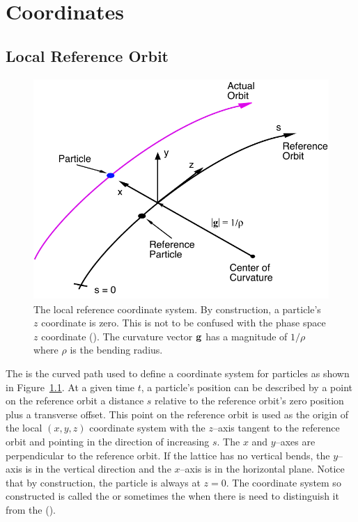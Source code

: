 %


\chapter{Coordinates}

\section{Local Reference Orbit}
\label{s:ref}


\begin{figure}[!b]
  \centering
  \includegraphics[height=8.4cm]{local-coords.pdf}
  \caption[The Local Reference System.]
{The local reference coordinate system. By construction, a
particle's $z$ coordinate is zero.  This is not to be confused with
the phase space $z$ coordinate ().  The curvature
vector ${\bf g}$ has a magnitude of $1/\rho$ where $\rho$ is the bending
radius.}
  \label{f:local.coords}
\end{figure}

The  is the curved path used to define a
coordinate system for particles as shown in
Figure~\ref{f:local.coords}. At a given time $t$, a particle's
position can be described by a point on the reference orbit a distance
$s$ relative to the reference orbit's zero position plus a transverse
offset. This point on the reference orbit is used as the origin of the
local $(x, y, z)$ coordinate system with the $z$--axis tangent to the
reference orbit and pointing in the direction of increasing $s$. The
$x$ and $y$--axes are perpendicular to the reference orbit. If the
lattice has no vertical bends, the $y$--axis is in the vertical
direction and the $x$--axis is in the horizontal plane. Notice that by
construction, the particle is always at $z = 0$. The coordinate system
so constructed is called the  or sometimes
the  when there is need to
distinguish it from the 
().

